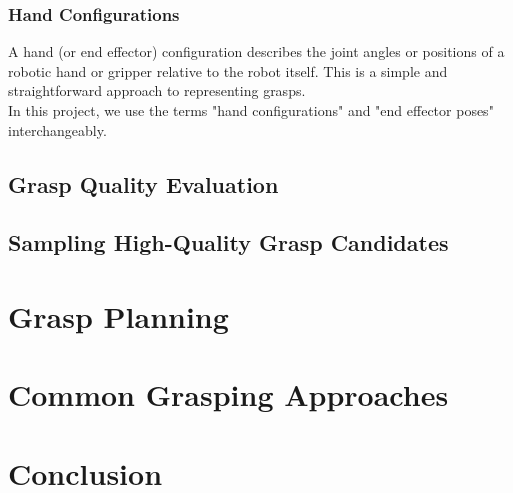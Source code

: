 \documentclass[12pt, a4paper]{report}
\theoremstyle{definition}
\begin{document}
\subsubsection{Hand Configurations}
\label{sec:2.1.1.3}
A hand (or end effector) configuration describes the joint angles or positions of a robotic hand or gripper relative to the robot itself. This is a simple and straightforward approach to representing grasps.\\

In this project, we use the terms "hand configurations" and "end effector poses" interchangeably.


\subsection{Grasp Quality Evaluation}
\label{sec:2.1.2}


\subsection{Sampling High-Quality Grasp Candidates}
\label{sec:2.1.3}


\section{Grasp Planning}
\label{sec:2.2}


\section{Common Grasping Approaches}
\label{sec:2.3}


\section{Conclusion}
\label{sec:2.4}


\end{document}
